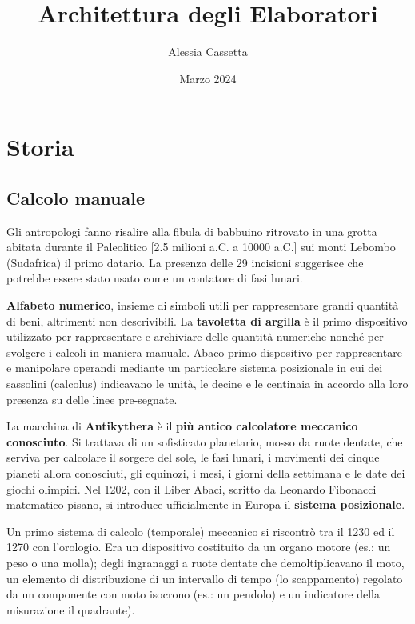 \documentclass[12pt]{article} %
\title{\Huge{Architettura degli Elaboratori}}
\author{\large{Alessia Cassetta}}
\date{Marzo 2024}
\begin{document}
\maketitle
\newpage
\tableofcontents
\newpage
\section{Storia} \subsection{Calcolo manuale} Gli antropologi fanno risalire alla fibula di babbuino ritrovato in una grotta abitata durante il Paleolitico [2.5 milioni a.C. a 10000 a.C.] sui monti Lebombo (Sudafrica) il primo datario. La presenza delle 29 incisioni suggerisce che potrebbe essere stato usato come un contatore di fasi lunari.
\par\medskip\noindent
\textbf{Alfabeto numerico}, insieme di simboli utili per rappresentare grandi quantità di beni, altrimenti non descrivibili. La \textbf{tavoletta di argilla} è il primo dispositivo utilizzato per rappresentare e archiviare delle quantità numeriche nonché per svolgere i calcoli in maniera manuale.
Abaco primo dispositivo per rappresentare e manipolare operandi mediante un particolare sistema posizionale in cui dei sassolini (calcolus) indicavano le unità, le decine e le centinaia in accordo alla loro presenza su delle linee pre-segnate. \par\medskip\noindent
La macchina di \textbf{Antikythera} è il \textbf{più antico calcolatore meccanico conosciuto}.  Si trattava di un sofisticato planetario, mosso da ruote dentate, che serviva per calcolare il sorgere del sole, le fasi lunari, i movimenti dei cinque pianeti allora conosciuti, gli equinozi, i mesi, i giorni della settimana e le date dei giochi olimpici.
Nel 1202, con il Liber Abaci, scritto da Leonardo Fibonacci matematico pisano, si introduce ufficialmente in Europa il \textbf{sistema posizionale}.
\par\medskip\noindent
Un primo sistema di calcolo (temporale) meccanico si riscontrò tra il 1230 ed il 1270 con l'orologio. Era un dispositivo costituito da un organo motore (es.: un peso o una molla); degli ingranaggi a ruote dentate che demoltiplicavano il moto, un elemento di distribuzione di un intervallo di tempo (lo scappamento) regolato da un componente con moto isocrono (es.: un pendolo) e un indicatore della misurazione il quadrante).
\par\medskip\noindent
\end{document}

